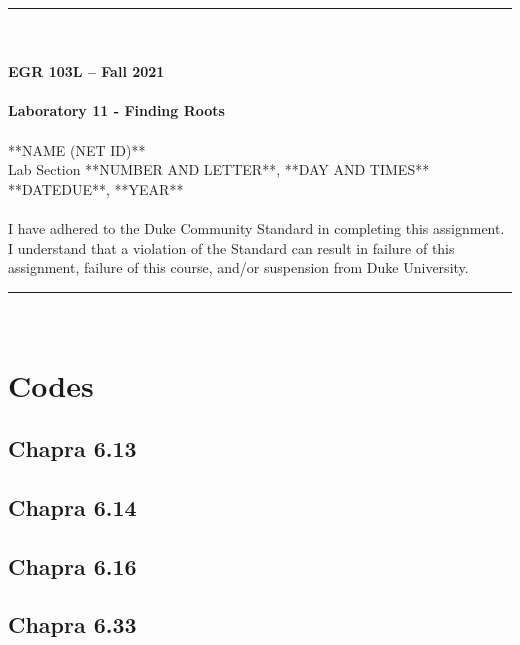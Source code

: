 \documentclass{article}
\begin{document}
\begin{center}
\rule{6.5in}{0.5mm}\\~\\
\textbf{\large EGR 103L -- Fall 2021}\\~\\
\textbf{\huge Laboratory 11 - Finding Roots}\\~\\
**NAME (NET ID)**\\
Lab Section **NUMBER AND LETTER**, **DAY AND TIMES**\\
**DATEDUE**, **YEAR**\\~\\
{\small I have adhered to the Duke Community Standard in completing this assignment.  I understand that a violation of the Standard can result in failure of this assignment, failure of this course, and/or suspension from Duke University.} 
\rule{6.5in}{0.5mm}\\
\end{center}
\tableofcontents
\listoffigures
\clearpage

\appendix
\section{Codes}
\lstset{style=python103, language=python} 

\subsection{Chapra 6.13}

\subsection{Chapra 6.14}
\clearpage

\subsection{Chapra 6.16}

\subsection{Chapra 6.33}
\clearpage
\end{document}
